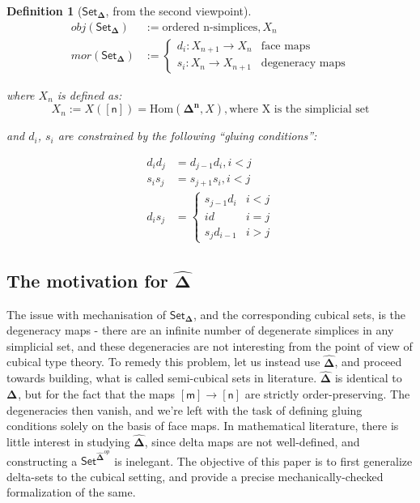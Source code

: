 \documentclass[10pt, titlepage]{amsart}
\newtheorem{definition}{Definition}
\newcommand{\Simplex}[1]{\ensuremath{\boldsymbol{\Delta^{#1}}}}
\newcommand{\DeltaHat}{\ensuremath{\hat{\boldsymbol{\Delta}}}}
\newcommand{\SSet}{\ensuremath{\mathsf{Set}_{\boldsymbol{\Delta}}}}
\newcommand{\Set}{\ensuremath{\mathsf{Set}}}
\newcommand{\sq}[1]{\ensuremath{\mathsf{[#1]}}}
\begin{document}
\begin{definition}[\SSet, from the second viewpoint]
  \begin{align*}
    obj(\SSet) & := \text{ordered n-simplices}, X_n \\
    mor(\SSet) & :=
    \begin{cases}
      d_i : X_{n + 1} \rightarrow X_n & \text{face maps}       \\
      s_i : X_n \rightarrow X_{n + 1} & \text{degeneracy maps}
    \end{cases}
  \end{align*}

  where $X_n$ is defined as:
  \begin{equation*}
    X_n := X(\sq{n}) = \text{Hom}(\Simplex{n}, X), \text{where X is the simplicial set}
  \end{equation*}

  and $d_i$, $s_i$ are constrained by the following ``gluing conditions'':

  \begin{align*}
    d_i d_j & = d_{j - 1} d_i, i < j \\
    s_i s_j & = s_{j + 1} s_i, i < j \\
    d_i s_j & =
    \begin{cases}
      s_{j - 1} d_i & i < j \\
      id            & i = j \\
      s_j d_{i - 1} & i > j
    \end{cases}
  \end{align*}
\end{definition}

\subsection{The motivation for \texorpdfstring{\DeltaHat}{delta sets}}

The issue with mechanisation of \SSet, and the corresponding cubical sets, is the degeneracy maps - there are an infinite number of degenerate simplices in any simplicial set, and these degeneracies are not interesting from the point of view of cubical type theory. To remedy this problem, let us instead use \DeltaHat, and proceed towards building, what is called semi-cubical sets in literature. $\DeltaHat$ is identical to \Simplex{}, but for the fact that the maps $\sq{m} \rightarrow \sq{n}$ are strictly order-preserving. The degeneracies then vanish, and we're left with the task of defining gluing conditions solely on the basis of face maps. In mathematical literature, there is little interest in studying \DeltaHat, since delta maps are not well-defined, and constructing a $\Set^{\DeltaHat^{op}}$ is inelegant. The objective of this paper is to first generalize delta-sets to the cubical setting, and provide a precise mechanically-checked formalization of the same.
\end{document}
